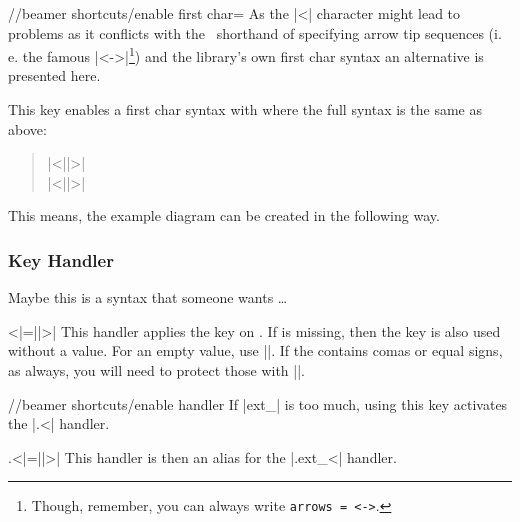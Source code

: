 \begin{key}{/\tikzext/beamer shortcuts/enable first char=}
  As the |<| character might lead to problems as it conflicts with the \tikzname\ shorthand
  of specifying arrow tip sequences
  (i.\,e. the famous |<->|\footnote{Though, remember, you can always write \texttt{arrows = <->}.})
  and the  library's own first char syntax
  an alternative is presented here.
  
  This key enables a first char syntax with  where the full syntax is the same as above:
  \begin{quote}
      |<||>|\\
      |<||>|
  \end{quote}
  
  This means, the example diagram can be created in the following way.
\begin{codeexample}[preamble=\usetikzlibrary{ext.beamer} \setbeamercovered{transparent},code only]
\end{codeexample}
\end{key}

\subsubsection{Key Handler}
Maybe this is a syntax that someone wants \dots
\begin{ext_handler}{{<}|=||>| }
  This handler applies the key on .
  If  is missing, then the key is also used without a value.
  For an empty value, use |{}|. If the  contains comas or equal signs,
  as always, you will need to protect those with |{}|.
  \begin{key}{/\tikzext/beamer shortcuts/enable handler}
    If |ext_| is too much, using this key activates the |.<| handler.
    \begin{handler}{{.<}|=||>| }
      This handler is then an alias for the |.ext_<| handler.
    \end{handler}
  \end{key}
\end{ext_handler}
\endinput